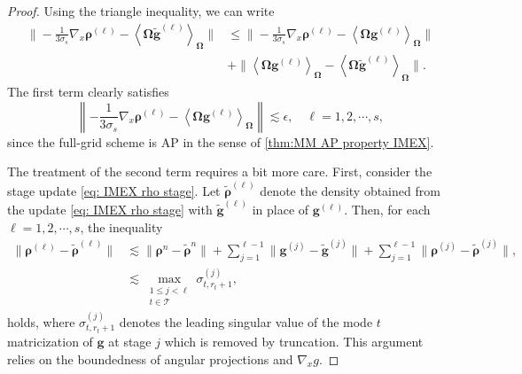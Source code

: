 \documentclass[10pt,a4paper]{amsart}
\begin{document}
\begin{proof}
    Using the triangle inequality, we can write
    \begin{align*}
        \Bigg\lVert -\frac{1}{3\sigma_s} \nabla_x \boldsymbol{\rho}^{(\ell)} - \left\langle \mathbf{\Omega} \widetilde{\mathbf{g}}^{(\ell)} \right\rangle_{\mathbf{\Omega}} \Bigg\rVert &\leq \Bigg\lVert -\frac{1}{3\sigma_s} \nabla_x \boldsymbol{\rho}^{(\ell)} - \left\langle \mathbf{\Omega} \mathbf{g}^{(\ell)} \right\rangle_{\mathbf{\Omega}} \Bigg\rVert \\ &+ \Bigg\lVert \left\langle \mathbf{\Omega} \mathbf{g}^{(\ell)} \right\rangle_{\mathbf{\Omega}} - \left\langle \mathbf{\Omega}\widetilde{\mathbf{g}}^{(\ell)} \right\rangle_{\mathbf{\Omega}} \Bigg\rVert.
    \end{align*}
    The first term clearly satisfies
    \begin{equation*}
        \left\lVert -\frac{1}{3\sigma_s} \nabla_x \boldsymbol{\rho}^{(\ell)} - \left\langle \mathbf{\Omega} \mathbf{g}^{(\ell)} \right\rangle_{\mathbf{\Omega}} \right\rVert \lesssim \epsilon, \quad \ell = 1,2, \cdots, s,
    \end{equation*}
    since the full-grid scheme is AP in the sense of \cref{thm:MM AP property IMEX}.

    The treatment of the second term requires a bit more care. First, consider the stage update \eqref{eq: IMEX rho stage}. Let $\widetilde{\boldsymbol{\rho}}^{(\ell)}$ denote the density obtained from the update \eqref{eq: IMEX rho stage} with $\widetilde{\mathbf{g}}^{(\ell)}$ in place of $\mathbf{g}^{(\ell)}$. Then, for each $\ell = 1, 2, \cdots, s$, the inequality
    \begin{align}
        \Big\lVert \boldsymbol{\rho}^{(\ell)} - \widetilde{\boldsymbol{\rho}}^{(\ell)} \Big\rVert &\lesssim \Big\lVert \boldsymbol{\rho}^{n} - \widetilde{\boldsymbol{\rho}}^{n} \Big\rVert  + \sum_{j=1}^{\ell-1} \Big\lVert \mathbf{g}^{(j)} - \widetilde{\mathbf{g}}^{(j)} \Big\rVert + \sum_{j=1}^{\ell-1} \Big\lVert \boldsymbol{\rho}^{(j)} - \widetilde{\boldsymbol{\rho}}^{(j)} \Big\rVert, \label{eq:rho stage bound} \\
        &\lesssim \max_{\substack{1 \leq j < \ell \\ t \in \mathcal{T}}} \sigma_{t,r_{t}+1}^{(j)}, \nonumber
    \end{align}
    holds, where $\sigma_{t,r_{t}+1}^{(j)}$ denotes the leading singular value of the mode $t$ matricization of $\mathbf{g}$ at stage $j$ which is removed by truncation. This argument relies on the boundedness of angular projections and $\nabla_{x}g$.


\end{proof}
\end{document}
